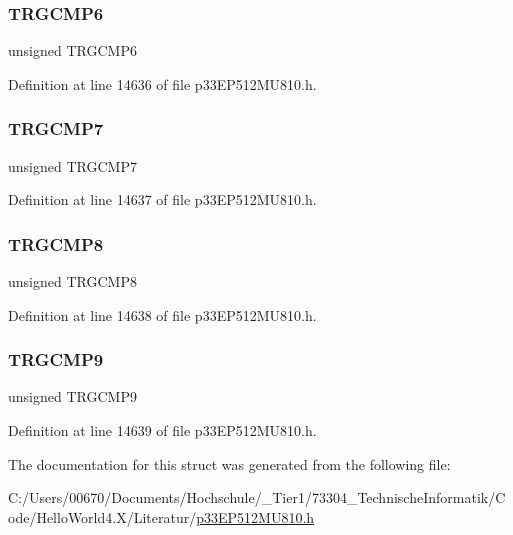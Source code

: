 \subsubsection{\texorpdfstring{T\+R\+G\+C\+M\+P6}{TRGCMP6}}
{\footnotesize\ttfamily unsigned T\+R\+G\+C\+M\+P6}



Definition at line 14636 of file p33\+E\+P512\+M\+U810.\+h.

\mbox{\label{structtag_t_r_i_g3_b_i_t_s_aa801131b5ab0b542a360d202275ea4fd}} 
\subsubsection{\texorpdfstring{T\+R\+G\+C\+M\+P7}{TRGCMP7}}
{\footnotesize\ttfamily unsigned T\+R\+G\+C\+M\+P7}



Definition at line 14637 of file p33\+E\+P512\+M\+U810.\+h.

\mbox{\label{structtag_t_r_i_g3_b_i_t_s_a7d4f3ec40334f00592eb7247457e2fd6}} 
\subsubsection{\texorpdfstring{T\+R\+G\+C\+M\+P8}{TRGCMP8}}
{\footnotesize\ttfamily unsigned T\+R\+G\+C\+M\+P8}



Definition at line 14638 of file p33\+E\+P512\+M\+U810.\+h.

\mbox{\label{structtag_t_r_i_g3_b_i_t_s_a0001e7efb9031bef24e7a19100d11b0b}} 
\subsubsection{\texorpdfstring{T\+R\+G\+C\+M\+P9}{TRGCMP9}}
{\footnotesize\ttfamily unsigned T\+R\+G\+C\+M\+P9}



Definition at line 14639 of file p33\+E\+P512\+M\+U810.\+h.



The documentation for this struct was generated from the following file\+:\begin{DoxyCompactItemize}
\item 
C\+:/\+Users/00670/\+Documents/\+Hochschule/\+\_\+\+Tier1/73304\+\_\+\+Technische\+Informatik/\+Code/\+Hello\+World4.\+X/\+Literatur/\hyperlink{p33_e_p512_m_u810_8h}{p33\+E\+P512\+M\+U810.\+h}\end{DoxyCompactItemize}
